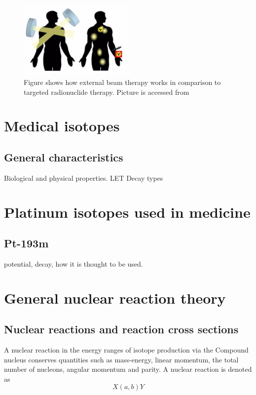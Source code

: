 \documentclass[a4paper,11pt,twoside]{book}
\begin{document}
\begin{figure}
    \centering
    \includegraphics[width=0.5\textwidth]{Theory/internal_vs_external.png}
    \caption{Figure shows how external beam therapy works in comparison to targeted radionuclide therapy. Picture is accessed from \cite{figure_internal_external}}
    \label{fig:interna_external}
\end{figure}


\section{Medical isotopes}

\subsection{General characteristics}
Biological and physical properties. 
LET
Decay types 





\section{Platinum isotopes used in medicine} 

\subsection{Pt-193m}
potential, decay, how it is thought to be used. 

\section{General nuclear reaction theory}

\subsection{Nuclear reactions and reaction cross sections}

A nuclear reaction in the energy ranges of isotope production via the Compound nucleus conserves quantities such as mass-energy, linear momentum, the total number of nucleons, angular momentum and parity. A nuclear reaction is denoted as
\begin{equation}
    X(a,b)Y
\end{equation}
\end{document}
